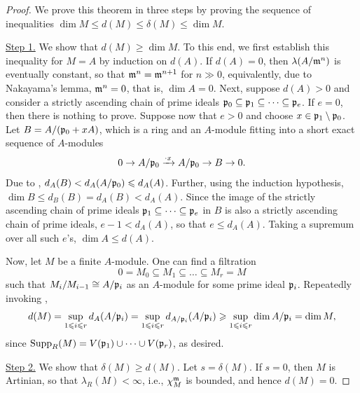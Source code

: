 \begin{proof}
    We prove this theorem in three steps by proving the sequence of inequalities $\dim M\le d(M)\le\delta(M)\le\dim M$.

    \noindent\underline{Step 1.} We show that $d(M)\ge\dim M$. To this end, we first establish this inequality for $M = A$ by induction on $d(A)$. If $d(A) = 0$, then $\lambda(A/\mathfrak{m}^n)$ is eventually constant, so that $\mathfrak{m}^n = \mathfrak{m}^{n + 1}$ for $n\gg 0$, equivalently, due to Nakayama's lemma, $\mathfrak{m}^n = 0$, that is, $\dim A = 0$. Next, suppose $d(A) > 0$ and consider a strictly ascending chain of prime ideals $\mathfrak{p}_0\subseteq\mathfrak{p}_1\subseteq\dots\subseteq\mathfrak{p}_e$. If $e = 0$, then there is nothing to prove. Suppose now that $e > 0$ and choose $x\in\mathfrak{p}_1\setminus\mathfrak{p}_0$. Let $B = A/(\mathfrak{p}_0 + xA)$, which is a ring and an $A$-module fitting into a short exact sequence of $A$-modules 
    \begin{equation*}
        0\to A/\mathfrak{p}_0\xrightarrow{\cdot x} A/\mathfrak{p}_0\to B\to 0.
    \end{equation*}
    Due to , $d_A(B) < d_A(A/\mathfrak{p}_0)\leqslant d_A(A)$. Further, using the induction hypothesis, $\dim B\le d_B(B) = d_A(B) < d_A(A)$. Since the image of the strictly ascending chain of prime ideals $\mathfrak{p}_1\subseteq\dots\subseteq\mathfrak{p}_e$ in $B$ is also a strictly ascending chain of prime ideals, $e - 1 < d_A(A)$, so that $e\le d_A(A)$. Taking a supremum over all such $e$'s, $\dim A\le d(A)$.

    Now, let $M$ be a finite $A$-module. One can find a filtration 
    \begin{equation*}
        0 = M_0\subseteq M_1\subseteq\dots\subseteq M_r = M
    \end{equation*}
    such that $M_i/M_{i - 1}\cong A/\mathfrak{p}_i$ as an $A$-module for some prime ideal $\mathfrak{p}_i$. Repeatedly invoking , 
    \begin{equation*}
        d(M) = \sup_{1\leqslant i\leqslant r}d_A(A/\mathfrak{p}_i) = \sup_{1\leqslant i\leqslant r} d_{A/\mathfrak{p}_i}(A/\mathfrak{p}_i)\geqslant\sup_{1\leqslant i\leqslant r}\dim A/\mathfrak{p}_i = \dim M,
    \end{equation*}
    since $\operatorname{Supp}_R(M) = V(\mathfrak{p}_1)\cup\dots\cup V(\mathfrak{p}_r)$, as desired.

    \hfill

    \noindent\underline{Step 2.} We show that $\delta(M)\ge d(M)$. Let $s = \delta(M)$. If $s = 0$, then $M$ is Artinian, so that $\lambda_R(M) < \infty$, i.e., $\chi_M^{\mathfrak{m}}$ is bounded, and hence $d(M) = 0$.
    

\end{proof}
